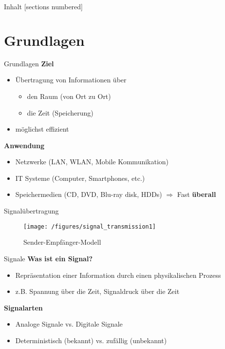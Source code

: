 \documentclass[handout,ngerman]{beamer}
\title[\titlename]{\titlename}
\author{Dominik Gedon}
\date{14. Dezember 2020}
\begin{document}
\maketitle

\begin{frame}[plain]{Inhalt}
	[sections numbered]
	\tableofcontents[hideallsubsections]
\end{frame}


\section{Grundlagen}
\begin{frame}{Grundlagen}
	\textbf{Ziel}
	\begin{itemize}
		\item \"Ubertragung von Informationen \"uber
		\begin{itemize}
			\item den Raum (von Ort zu Ort)
			\item die Zeit (Speicherung)
		\end{itemize}
		\item m\"oglichst effizient
	\end{itemize} 
	
	\textbf{Anwendung}
	\begin{itemize}
		\item Netzwerke (LAN, WLAN,  Mobile Kommunikation)
		\item IT Systeme (Computer, Smartphones, etc.)
		\item Speichermedien (CD, DVD, Blu-ray disk, HDDs)\newline
		$\Longrightarrow$ Fast \textbf{\alert{\"uberall}}	
	\end{itemize} 
\end{frame}


\begin{frame}{Signal\"ubertragung}
	\begin{figure}[htbp]
 	 	\centering 	
 		\texttt{[image: /figures/signal\_transmission1]} 	 
 		\caption {Sender-Empf\"anger-Modell \cite{sender-empfaenger}}
	\end{figure}
\end{frame}


\begin{frame}{Signale}
	\textbf{Was ist ein Signal?}
	\begin{itemize}
		\item Repr\"asentation einer Information durch einen physikalischen Prozess
		\item z.B.  Spannung \"uber die Zeit, Signaldruck \"uber die Zeit		
	\end{itemize} 
	\textbf{Signalarten}	
	\begin{itemize}
		\item Analoge Signale vs. Digitale Signale
		\item Deterministisch (bekannt) vs. zuf\"allig (unbekannt) 
	\end{itemize} 
\end{frame}
\end{document}
